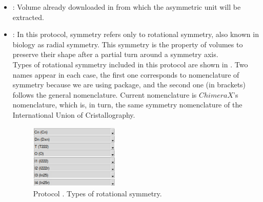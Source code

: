 \begin{itemize}
  \begin{itemize}
  \item {}: Volume already downloaded in \scipion from which the asymmetric unit will be extracted.
  \item {}: In this protocol, symmetry refers only to rotational symmetry, also known in biology as radial symmetry. This symmetry is the property of volumes to preserve their shape after a partial turn around a symmetry axis.  \\
  Types of rotational symmetry included in this protocol are shown in . Two names appear in each case, the first one corresponds to  nomenclature of symmetry because we are using  package, and the second one (in brackets) follows the general \scipion nomenclature. Current \scipion nomenclature is $ChimeraX$'s nomenclature, which is, in turn, the same symmetry nomenclature of the International Union of Cristallography. 
  
    \begin{figure}[H]
    \centering 
    \captionsetup{width=.7\linewidth} 
    \includegraphics[width=0.4\textwidth]{Images_appendix/Fig108.pdf}
    \caption{Protocol . Types of rotational symmetry.}
    \label{fig:app_protocol_extractUnitCell_2}
   \end{figure}
   

\end{itemize}
\end{itemize}
